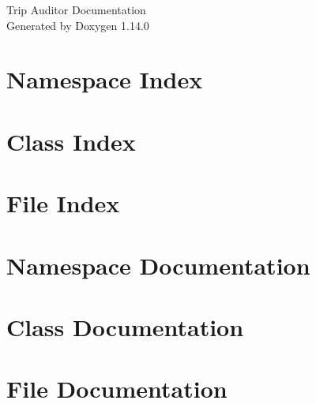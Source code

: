 \documentclass[twoside]{book}
\newcommand{\+}{\discretionary{\mbox{\scriptsize$\hookleftarrow$}}{}{}}
\newcommand{\clearemptydoublepage}{%
    \newpage{\pagestyle{empty}\cleardoublepage}%
  }
\begin{document}
  \raggedbottom
    \hypersetup{pageanchor=false,
                bookmarksnumbered=true,
                pdfencoding=unicode
               }
  \begin{titlepage}
  \vspace*{7cm}
  \begin{center}%
  {\Large Trip Auditor Documentation}\\
  \vspace*{1cm}
  {\large Generated by Doxygen 1.14.0}\\
  \end{center}
  \end{titlepage}
  \clearemptydoublepage
  \tableofcontents
  \clearemptydoublepage
  \hypersetup{pageanchor=true}
\chapter{Namespace Index}

\chapter{Class Index}

\chapter{File Index}

\chapter{Namespace Documentation}

\chapter{Class Documentation}



\chapter{File Documentation}


  \backmatter
  \newpage
  \clearemptydoublepage
  \printindex
\end{document}
